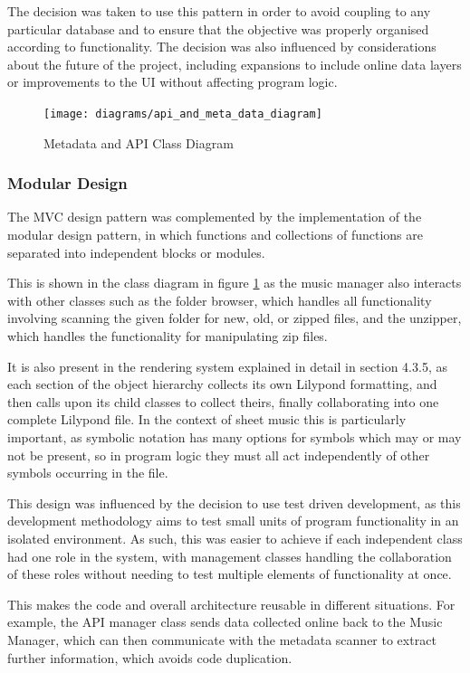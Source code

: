 The decision was taken to use this pattern in order to avoid coupling to any particular database and to ensure that the objective was properly organised according to functionality. The decision was also influenced by considerations about the future of the project, including expansions to include online data layers or improvements to the UI without affecting program logic.

\begin{figure}[H]
    \centering
    \texttt{[image: diagrams/api\_and\_meta\_data\_diagram]}
    \caption{Metadata and API Class Diagram}
    \label{fig:metadiagram}
\end{figure}

\subsubsection{Modular Design}
The MVC design pattern was complemented by the implementation of the  modular design pattern, in which functions and collections of functions are separated into independent blocks or modules. %

This is shown in the class diagram in figure \ref{fig:metadiagram} as the music manager also interacts with other classes such as the folder browser, which handles all functionality involving scanning the given folder for new, old, or zipped files, and the unzipper, which handles the functionality for manipulating zip files.

It is also present in the rendering system explained in detail in section 4.3.5, as each section of the object hierarchy collects its own Lilypond formatting, and then calls upon its child classes to collect theirs, finally collaborating into one complete Lilypond file. In the context of sheet music this is particularly important, as symbolic notation has many options for symbols which may or may not be present, so in program logic they must all act independently of other symbols occurring in the file.

This design was influenced by the decision to use test driven development, as this development methodology aims to test small units of program functionality in an isolated environment. %
 As such, this was easier to achieve if each independent class had one role in the system, with management classes handling the collaboration of these roles without needing to test multiple elements of functionality at once. 

This makes the code and overall architecture reusable in different situations. For example, the API manager class sends data collected online back to the Music Manager, which can then communicate with the metadata scanner to extract further information, which avoids code duplication.

